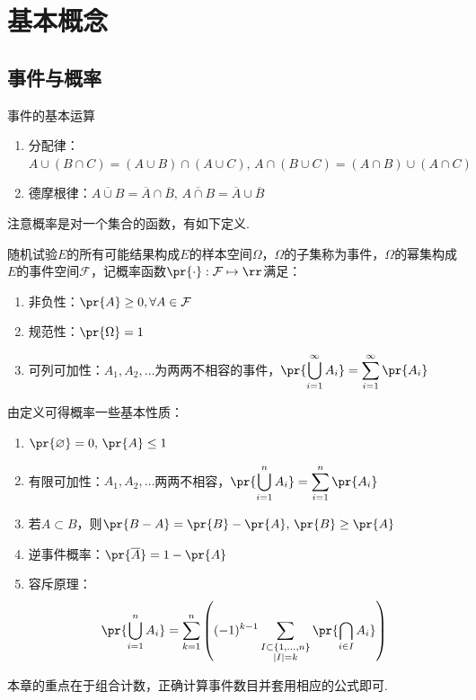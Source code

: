 
\section{基本概念}
\subsection{事件与概率}
\begin{proposition}事件的基本运算
	\begin{enumerate}
		\item 分配律：$A\cup(B\cap C)=(A\cup B)\cap(A\cup C),\,A\cap(B\cup C)=(A\cap B)\cup(A\cap C)$
		\item 德摩根律：$\overline{A\cup B}=\overline{A}\cap\overline{B},\,\overline{A\cap B}=\overline{A}\cup\overline{B}$
	\end{enumerate}
\end{proposition}
注意概率是对一个集合的函数，有如下定义.
\begin{definition}[概率]
	随机试验$E$的所有可能结果构成$E$的样本空间$\Omega$，$\Omega$的子集称为事件，$\Omega$的幂集构成$E$的事件空间$\mathcal{F}$，记概率函数$\pr{\cdot}:\mathcal{F}\mapsto\rr$满足：
	\begin{enumerate}
		\item 非负性：$\pr{A}\geq 0,\forall A\in\mathcal{F}$
		\item 规范性：$\pr{\Omega}=1$
		\item 可列可加性：$A_1,A_2,\ldots$为两两不相容的事件，$\displaystyle \pr{\bigcup_{i=1}^\infty A_i}=\sum_{i=1}^\infty \pr{A_i}$
	\end{enumerate}
\end{definition}
由定义可得概率一些基本性质：
\begin{enumerate}
	\item $\pr{\varnothing}=0,\,\pr{A}\leq 1$
	\item 有限可加性：$A_1,A_2,\ldots$两两不相容，$\displaystyle \pr{\bigcup_{i=1}^n A_i}=\sum_{i=1}^n \pr{A_i}$
	\item 若$A\subset B$，则$\pr{B-A}=\pr{B}-\pr{A},\,\pr{B}\geq \pr{A}$
	\item 逆事件概率：$\pr{\overline{A}}=1-\pr{A}$
	\item 容斥原理：
	\[\pr{\bigcup _{{i=1}}^{n}A_{i}}=\sum _{{k=1}}^{n}\left((-1)^{{k-1}}\sum _{\substack{I\subset \{1,\ldots ,n\}\\|I|=k}}\pr{\bigcap _{{i\in I}}A_{i}}\right)\]
\end{enumerate}
\par 本章的重点在于组合计数，正确计算事件数目并套用相应的公式即可.

